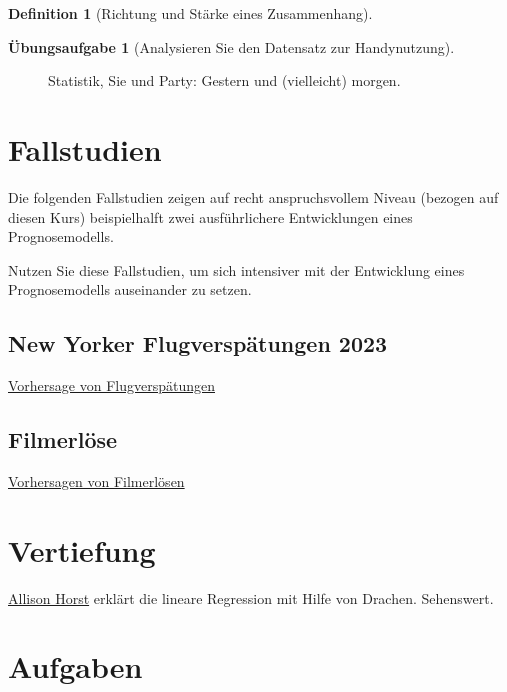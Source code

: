 \documentclass[
  a4paper,
  DIV=11]{scrreprt}
\theoremstyle{definition}
\newtheorem{exercise}{Übungsaufgabe}[chapter]
\theoremstyle{definition}
\theoremstyle{definition}
\newtheorem{definition}{Definition}[chapter]
\theoremstyle{remark}
\begin{document}
\begin{definition}[Richtung und Stärke eines
Zusammenhang]
\begin{exercise}[Analysieren Sie den Datensatz zur
Handynutzung]
\begin{figure}
\begin{minipage}{0.50\linewidth}

\end{minipage}%

\caption[\label{fig-dranbleiben}Statistik, Sie und Party: Gestern und
(vielleicht) morgen.]{\label{fig-dranbleiben}Statistik, Sie und Party: Gestern und
(vielleicht) morgen.\footnotemark{}}

\end{figure}%

\section{Fallstudien}\label{fallstudien-2}

Die folgenden Fallstudien zeigen auf recht anspruchsvollem Niveau
(bezogen auf diesen Kurs) beispielhalft zwei ausführlichere
Entwicklungen eines Prognosemodells.

Nutzen Sie diese Fallstudien, um sich intensiver mit der Entwicklung
eines Prognosemodells auseinander zu setzen.

\subsection{New Yorker Flugverspätungen
2023}\label{new-yorker-flugverspuxe4tungen-2023}

\href{https://datenwerk.netlify.app/posts/flights-delay-simplified//}{Vorhersage
von Flugverspätungen}

\subsection{Filmerlöse}\label{filmerluxf6se}

\href{https://data-se.netlify.app/2020/11/13/fallstudie-zur-regressionsanalyse-ggplot2movies/}{Vorhersagen
von Filmerlösen}

\section{Vertiefung}\label{vertiefung-8}

\href{https://allisonhorst.com/linear-regression-dragons}{Allison Horst}
erklärt die lineare Regression mit Hilfe von Drachen. Sehenswert.

\section{Aufgaben}\label{aufgaben-8}


\end{exercise}
\end{definition}
\end{document}
